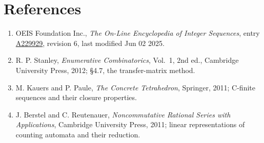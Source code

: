 \documentclass[11pt]{article}
\theoremstyle{definition}
\begin{document}
\section{References}

\begin{enumerate}

\item OEIS Foundation Inc., \emph{The On-Line Encyclopedia of Integer Sequences}, entry \href{https://oeis.org/A229929}{A229929}, revision 6, last modified Jun 02 2025.

\item R. P. Stanley, \emph{Enumerative Combinatorics}, Vol.~1, 2nd ed., Cambridge University Press, 2012; \S4.7, the transfer-matrix method.

\item M. Kauers and P. Paule, \emph{The Concrete Tetrahedron}, Springer, 2011; C-finite sequences and their closure properties.

\item J. Berstel and C. Reutenauer, \emph{Noncommutative Rational Series with Applications}, Cambridge University Press, 2011; linear representations of counting automata and their reduction.

\end{enumerate}
\end{document}
